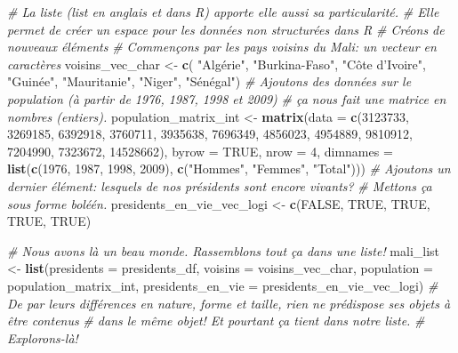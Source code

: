 \documentclass[]{book}
\newenvironment{Shaded}{\begin{snugshade}}{\end{snugshade}}
\newcommand{\KeywordTok}[1]{\textcolor[rgb]{0.13,0.29,0.53}{\textbf{#1}}}
\newcommand{\DataTypeTok}[1]{\textcolor[rgb]{0.13,0.29,0.53}{#1}}
\newcommand{\DecValTok}[1]{\textcolor[rgb]{0.00,0.00,0.81}{#1}}
\newcommand{\StringTok}[1]{\textcolor[rgb]{0.31,0.60,0.02}{#1}}
\newcommand{\CommentTok}[1]{\textcolor[rgb]{0.56,0.35,0.01}{\textit{#1}}}
\newcommand{\OtherTok}[1]{\textcolor[rgb]{0.56,0.35,0.01}{#1}}
\newcommand{\NormalTok}[1]{#1}
\begin{document}
\begin{Shaded}
\begin{Highlighting}[]
\CommentTok{# La liste (list en anglais et dans R) apporte elle aussi sa particularité.}
\CommentTok{# Elle permet de créer un espace pour les données non structurées dans R}
\CommentTok{# Créons de nouveaux éléments}
\CommentTok{# Commençons par les pays voisins du Mali: un vecteur en caractères}
\NormalTok{voisins_vec_char <-}\StringTok{ }\KeywordTok{c}\NormalTok{( }\StringTok{"Algérie"}\NormalTok{, }\StringTok{"Burkina-Faso"}\NormalTok{, }\StringTok{"Côte d'Ivoire"}\NormalTok{, }\StringTok{"Guinée"}\NormalTok{, }\StringTok{"Mauritanie"}\NormalTok{, }\StringTok{"Niger"}\NormalTok{, }\StringTok{"Sénégal"}\NormalTok{)}
\CommentTok{# Ajoutons des données sur le population (à partir de 1976, 1987, 1998 et 2009)}
\CommentTok{# ça nous fait une matrice en nombres (entiers).}
\NormalTok{population_matrix_int <-}\StringTok{ }\KeywordTok{matrix}\NormalTok{(}\DataTypeTok{data =} \KeywordTok{c}\NormalTok{(}\DecValTok{3123733}\NormalTok{, }\DecValTok{3269185}\NormalTok{, }\DecValTok{6392918}\NormalTok{, }
                                         \DecValTok{3760711}\NormalTok{, }\DecValTok{3935638}\NormalTok{, }\DecValTok{7696349}\NormalTok{,}
                                         \DecValTok{4856023}\NormalTok{, }\DecValTok{4954889}\NormalTok{, }\DecValTok{9810912}\NormalTok{,}
                                         \DecValTok{7204990}\NormalTok{, }\DecValTok{7323672}\NormalTok{, }\DecValTok{14528662}\NormalTok{),}
                                \DataTypeTok{byrow =} \OtherTok{TRUE}\NormalTok{,}
                                \DataTypeTok{nrow =} \DecValTok{4}\NormalTok{,}
                                \DataTypeTok{dimnames =} \KeywordTok{list}\NormalTok{(}\KeywordTok{c}\NormalTok{(}\DecValTok{1976}\NormalTok{, }\DecValTok{1987}\NormalTok{, }\DecValTok{1998}\NormalTok{, }\DecValTok{2009}\NormalTok{), }
                                                \KeywordTok{c}\NormalTok{(}\StringTok{"Hommes"}\NormalTok{, }\StringTok{"Femmes"}\NormalTok{, }\StringTok{"Total"}\NormalTok{)))}
\CommentTok{# Ajoutons un dernier élément: lesquels de nos présidents sont encore vivants?}
\CommentTok{# Mettons ça sous forme boléén.}
\NormalTok{presidents_en_vie_vec_logi <-}\StringTok{ }\KeywordTok{c}\NormalTok{(}\OtherTok{FALSE}\NormalTok{, }\OtherTok{TRUE}\NormalTok{, }\OtherTok{TRUE}\NormalTok{, }\OtherTok{TRUE}\NormalTok{, }\OtherTok{TRUE}\NormalTok{)}

\CommentTok{# Nous avons là un beau monde. Rassemblons tout ça dans une liste!}
\NormalTok{mali_list <-}\StringTok{ }\KeywordTok{list}\NormalTok{(}\DataTypeTok{presidents =}\NormalTok{ presidents_df,}
                  \DataTypeTok{voisins =}\NormalTok{ voisins_vec_char,}
                  \DataTypeTok{population =}\NormalTok{ population_matrix_int,}
                  \DataTypeTok{presidents_en_vie =}\NormalTok{ presidents_en_vie_vec_logi)}
\CommentTok{# De par leurs différences en nature, forme et taille, rien ne prédispose ses objets à être contenus}
\CommentTok{# dans le même objet! Et pourtant ça tient dans notre liste.}
\CommentTok{# Explorons-là!}
\end{Highlighting}
\end{Shaded}
\end{document}
